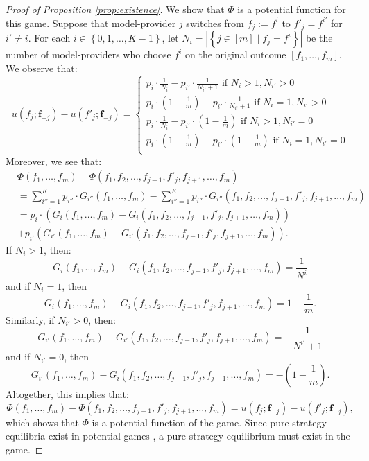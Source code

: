 \documentclass[letterpaper,11pt]{article}
\theoremstyle{plain}
\begin{document}
\begin{proof}[Proof of Proposition \ref{prop:existence}]
We show that $\Phi$ is a potential function for this game. Suppose that model-provider $j$ switches from $f_j := f^i$ to $f'_j = f^{i'}$ for $i' \neq i$. For each $i \in \left\{0, 1, \ldots, K-1\right\}$, let $N_i = |\left\{j \in [m] \mid f_j = f^i\right\}|$ be the number of model-providers who choose $f^i$ on the original outcome $[f_1, \ldots, f_m]$. We observe that:
\[ u(f_j; \mathbf{f}_{-j}) - u(f'_{j}; \mathbf{f}_{-j}) = 
\begin{cases}
p_i \cdot \frac{1}{N_i} - p_{i'} \cdot \frac{1}{N_{i'}+1}  \text{ if } N_i > 1, N_{i'} > 0 \\
p_i \cdot \left(1 - \frac{1}{m} \right) - p_{i'} \cdot \frac{1}{N_{i'}+1} \text{ if } N_i = 1, N_{i'} > 0 \\
p_i \cdot \frac{1}{N_i} - p_{i'} \cdot \left(1 - \frac{1}{m} \right) \text{ if } N_i > 1, N_{i'} = 0 \\
p_i \cdot \left(1 - \frac{1}{m} \right) - p_{i'} \cdot \left(1 - \frac{1}{m} \right)  \text{ if } N_i = 1, N_{i'} = 0 \\
\end{cases}
\]
Moreover,  we see that: 
\begin{align*}
  &\Phi(f_1, \ldots, f_m) - \Phi(f_1, f_2, \ldots, f_{j-1}, f'_j, f_{j+1}, \ldots, f_m) \\
  &=   \sum_{i''=1}^K p_{i''} \cdot G_{i''}(f_1, \ldots, f_m) - \sum_{i''=1}^K p_{i''} \cdot  G_{i''}(f_1, f_2, \ldots, f_{j-1}, f'_j, f_{j+1}, \ldots, f_m) \\
  &= p_i \cdot \left(G_i(f_1, \ldots, f_m) - G_i(f_1, f_2, \ldots, f_{j-1}, f'_j, f_{j+1}, \ldots, f_m)\right)\\
  &+ p_{i'} \left(G_{i'}(f_1, \ldots, f_m) - G_{i'}(f_1, f_2, \ldots, f_{j-1}, f'_j, f_{j+1}, \ldots, f_m)\right).
\end{align*}
If $N_i > 1$, then:
\[G_i(f_1, \ldots, f_m) - G_i(f_1, f_2, \ldots, f_{j-1}, f'_j, f_{j+1}, \ldots, f_m) = \frac{1}{N^i}\]
and if $N_i = 1$, then 
\[G_i(f_1, \ldots, f_m) - G_i(f_1, f_2, \ldots, f_{j-1}, f'_j, f_{j+1}, \ldots, f_m) = 1 - \frac{1}{m}.\]
Similarly, if $N_{i'} > 0$, then:
\[G_{i'}(f_1, \ldots, f_m) - G_{i'}(f_1, f_2, \ldots, f_{j-1}, f'_j, f_{j+1}, \ldots, f_m) = -\frac{1}{N^{i'} + 1}\]
and if $N_{i'} = 0$, then 
\[G_{i'}(f_1, \ldots, f_m) - G_i(f_1, f_2, \ldots, f_{j-1}, f'_j, f_{j+1}, \ldots, f_m) = - \left(1 - \frac{1}{m}\right).\]
Altogether, this implies that:
\[\Phi(f_1, \ldots, f_m) - \Phi(f_1, f_2, \ldots, f_{j-1}, f'_j, f_{j+1}, \ldots, f_m) = u(f_j; \mathbf{f}_{-j}) - u(f'_{j}; \mathbf{f}_{-j}),\]
which shows that $\Phi$ is a potential function of the game. Since pure strategy equilibria exist in potential games \citep{R73, MS96}, a pure strategy equilibrium must exist in the game.   
\end{proof}
\end{document}
